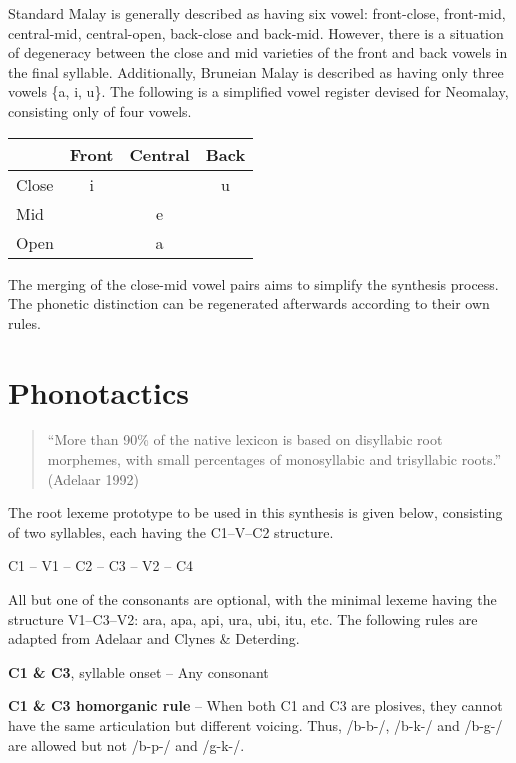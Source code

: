 \documentclass{article}
\begin{document}
Standard Malay is generally described as having six vowel: front-close, front-mid, central-mid, central-open, back-close and back-mid. However, there is a situation of degeneracy between the close and mid varieties of the front and back vowels in the final syllable. Additionally, Bruneian Malay is described as having only three vowels \{a, i, u\}. The following is a simplified vowel register devised for Neomalay, consisting only of four vowels.

\begin{center}
    \begin{tabular}{l c c c}
        \toprule
              & Front & Central & Back \\ \midrule
        Close & i     &         & u    \\
        Mid   &       & e       &      \\
        Open  &       & a       &      \\ \bottomrule
    \end{tabular}
\end{center} \bigskip

The merging of the close-mid vowel pairs aims to simplify the synthesis process. The phonetic distinction can be regenerated afterwards according to their own rules.

\pagebreak
\section{Phonotactics}

\begin{quote}
    ``More than 90\% of the native lexicon is based on disyllabic root morphemes, with small percentages of monosyllabic and trisyllabic roots.'' (Adelaar 1992)
\end{quote}

The root lexeme prototype to be used in this synthesis is given below, consisting of two syllables, each having the C1--V--C2 structure.

\begin{center}
    C1 -- V1 -- C2 -- C3 -- V2 -- C4
\end{center}

All but one of the consonants are optional, with the minimal lexeme having the structure V1--C3--V2: ara, apa, api, ura, ubi, itu, etc. The following rules are adapted from Adelaar and Clynes \& Deterding.

\textbf{C1 \& C3}, syllable onset -- Any consonant

\textbf{C1 \& C3 homorganic rule} -- When both C1 and C3 are plosives, they cannot have the same articulation but different voicing. Thus, /b-b-/, /b-k-/ and /b-g-/ are allowed but not /b-p-/ and /g-k-/.
\end{document}

